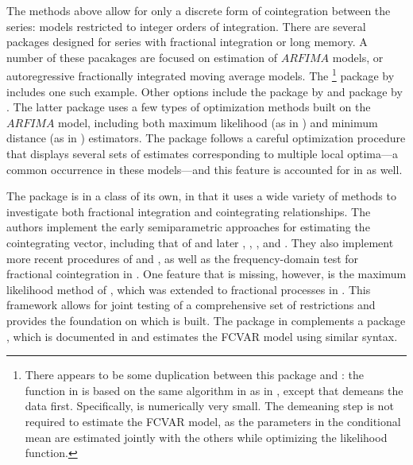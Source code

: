 \documentclass[article]{jss}
\newcommand{\fct}[1]{\code{#1()}}
\begin{document}
The methods above allow for only a discrete form of cointegration between the series:
models restricted to integer orders of integration. 
There are several packages designed for series with fractional integration or long memory. 
% 
A number of these pacakages are focused on estimation of $ARFIMA$ models, 
or autoregressive fractionally integrated moving average models. 
% 
The %
\footnote{There appears to be some duplication between this package and : 
the \fct{diffseries} function in  is based on the same algorithm in \cite{Jensen2014} as \fct{FracDiff} in , except that \fct{diffseries} demeans the data first. 
Specifically,  is numerically very small. 
The demeaning step is not required to estimate the FCVAR model, as the parameters in the conditional mean are estimated jointly with the others while optimizing the likelihood function. }
%
package by \citep{fracdiff2020} includes one such example. 
% 
Other options include the  package by \cite{arfima2018}
and  package by \citep{nsarfima2019}. 
The latter package uses a few types of optimization methods built on the $ARFIMA$ model, including both maximum likelihood (as in \citet{Beran1995}) and minimum distance (as in \citet{Mayoral2007}) estimators. 
The  package follows a careful optimization procedure 
that displays several sets of estimates corresponding to multiple local optima---a common occurrence in these models---and this feature is accounted for in  as well.
% 

The package  is in a class of its own, in that it uses a wide variety of methods to investigate both fractional integration and cointegrating relationships. 
The authors implement the early semiparametric approaches for estimating the cointegrating vector, including that of 
\citet{Robinson1994} and later \citet{RobinsonMarinucci2003}, \citet{MarmolVelasco2004},  \citet{ChristensenNielsen2006}, and \citet{Robinson2008}. 
% 
They also implement more recent procedures of \citet{Nielsen2010} and \citet{WangWangChan2015}, 
as well as the frequency-domain test for fractional cointegration in \citet{SouzaEtal2018}. 
% 
% 
One feature that is missing, however, is the maximum likelihood method of \citet{Johansen1995}, 
which was extended to fractional processes in \cite{Johansen2008}. %
This framework allows for joint testing of a comprehensive set of restrictions and provides the 
foundation on which  is built. 
% 
The  package in  complements
a  package , which is documented in \cite{Nielsen2016}
and estimates the FCVAR model using similar syntax. 
 
\end{document}
